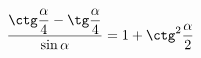 \begin{ex}[type=prove_identity]
	\begin{condition}
		\( \dfrac{\ctg\dfrac{\alpha}{4}-\tg\dfrac{\alpha}{4}}{\sin\alpha}=1+\ctg^2\dfrac{\alpha}{2} \)
	\end{condition}
\end{ex}